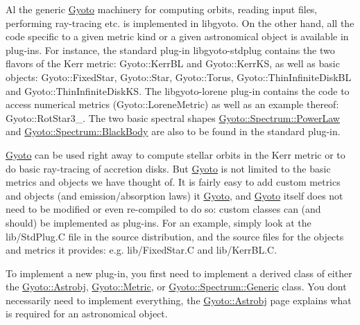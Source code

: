 Al the generic \mbox{\hyperlink{namespace_gyoto}{Gyoto}} machinery for computing orbits, reading input files, performing ray-\/tracing etc. is implemented in libgyoto. On the other hand, all the code specific to a given metric kind or a given astronomical object is available in plug-\/ins. For instance, the standard plug-\/in libgyoto-\/stdplug contains the two flavors of the Kerr metric\+: Gyoto\+::\+Kerr\+BL and Gyoto\+::\+Kerr\+KS, as well as basic objects\+: Gyoto\+::\+Fixed\+Star, Gyoto\+::\+Star, Gyoto\+::\+Torus, Gyoto\+::\+Thin\+Infinite\+Disk\+BL and Gyoto\+::\+Thin\+Infinite\+Disk\+KS. The libgyoto-\/lorene plug-\/in contains the code to access numerical metrics (Gyoto\+::\+Lorene\+Metric) as well as an example thereof\+: Gyoto\+::\+Rot\+Star3\+\_. The two basic spectral shapes \mbox{\hyperlink{class_gyoto_1_1_spectrum_1_1_power_law}{Gyoto\+::\+Spectrum\+::\+Power\+Law}} and \mbox{\hyperlink{class_gyoto_1_1_spectrum_1_1_black_body}{Gyoto\+::\+Spectrum\+::\+Black\+Body}} are also to be found in the standard plug-\/in.

\mbox{\hyperlink{namespace_gyoto}{Gyoto}} can be used right away to compute stellar orbits in the Kerr metric or to do basic ray-\/tracing of accretion disks. But \mbox{\hyperlink{namespace_gyoto}{Gyoto}} is not limited to the basic metrics and objects we have thought of. It is fairly easy to add custom metrics and objects (and emission/absorption laws) it \mbox{\hyperlink{namespace_gyoto}{Gyoto}}, and \mbox{\hyperlink{namespace_gyoto}{Gyoto}} itself does not need to be modified or even re-\/compiled to do so\+: custom classes can (and should) be implemented as plug-\/ins. For an example, simply look at the lib/\+Std\+Plug.\+C file in the source distribution, and the source files for the objects and metrics it provides\+: e.\+g. lib/\+Fixed\+Star.\+C and lib/\+Kerr\+BL.\+C.

To implement a new plug-\/in, you first need to implement a derived class of either the \mbox{\hyperlink{namespace_gyoto_1_1_astrobj}{Gyoto\+::\+Astrobj}}, \mbox{\hyperlink{namespace_gyoto_1_1_metric}{Gyoto\+::\+Metric}}, or \mbox{\hyperlink{class_gyoto_1_1_spectrum_1_1_generic}{Gyoto\+::\+Spectrum\+::\+Generic}} class. You don\textquotesingle{}t necessarily need to implement everything, the \mbox{\hyperlink{namespace_gyoto_1_1_astrobj}{Gyoto\+::\+Astrobj}} page explains what is required for an astronomical object.

